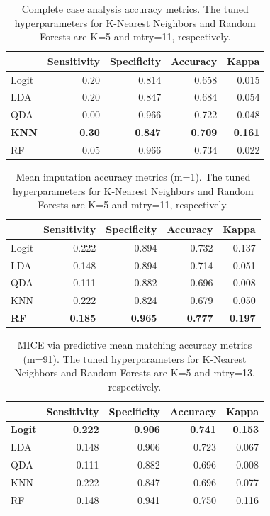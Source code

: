 \documentclass[12pt,]{article}
\begin{document}
\begin{table}[!h]

\caption{\label{tab:unnamed-chunk-5}\label{tab:cc-metrics} Complete case analysis accuracy metrics.  The tuned hyperparameters for K-Nearest Neighbors and Random Forests are K=5 and mtry=11, respectively.}
\centering
\fontsize{10}{12}\selectfont
\begin{tabular}{lrrrr}
\toprule
  & Sensitivity & Specificity & Accuracy & Kappa\\
\midrule
Logit & 0.20 & 0.814 & 0.658 & 0.015\\
LDA & 0.20 & 0.847 & 0.684 & 0.054\\
QDA & 0.00 & 0.966 & 0.722 & -0.048\\
\textbf{KNN} & \textbf{0.30} & \textbf{0.847} & \textbf{0.709} & \textbf{0.161}\\
RF & 0.05 & 0.966 & 0.734 & 0.022\\
\bottomrule
\end{tabular}
\end{table}

\begin{table}[!h]

\caption{\label{tab:unnamed-chunk-6}\label{tab:mean-metrics} Mean imputation accuracy metrics (m=1).  The tuned hyperparameters for K-Nearest Neighbors and Random Forests are K=5 and mtry=11, respectively.}
\centering
\fontsize{10}{12}\selectfont
\begin{tabular}{lrrrr}
\toprule
  & Sensitivity & Specificity & Accuracy & Kappa\\
\midrule
Logit & 0.222 & 0.894 & 0.732 & 0.137\\
LDA & 0.148 & 0.894 & 0.714 & 0.051\\
QDA & 0.111 & 0.882 & 0.696 & -0.008\\
KNN & 0.222 & 0.824 & 0.679 & 0.050\\
\textbf{RF} & \textbf{0.185} & \textbf{0.965} & \textbf{0.777} & \textbf{0.197}\\
\bottomrule
\end{tabular}
\end{table}

\begin{table}[!h]

\caption{\label{tab:unnamed-chunk-7}\label{tab:pmm-metrics} MICE via predictive mean matching accuracy metrics (m=91).  The tuned hyperparameters for K-Nearest Neighbors and Random Forests are K=5 and mtry=13, respectively.}
\centering
\fontsize{10}{12}\selectfont
\begin{tabular}{lrrrr}
\toprule
  & Sensitivity & Specificity & Accuracy & Kappa\\
\midrule
\textbf{Logit} & \textbf{0.222} & \textbf{0.906} & \textbf{0.741} & \textbf{0.153}\\
LDA & 0.148 & 0.906 & 0.723 & 0.067\\
QDA & 0.111 & 0.882 & 0.696 & -0.008\\
KNN & 0.222 & 0.847 & 0.696 & 0.077\\
RF & 0.148 & 0.941 & 0.750 & 0.116\\
\bottomrule
\end{tabular}
\end{table}
\end{document}
